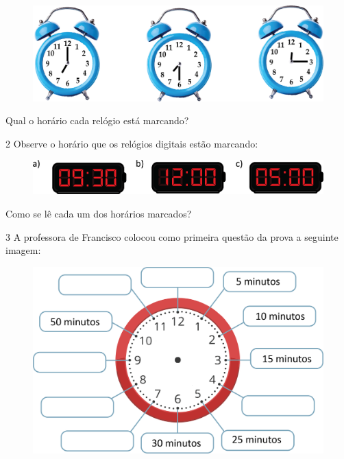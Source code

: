 \begin{figure}[htpb!]
\includegraphics[width=\textwidth]{./media/image51.png}
\end{figure}

Qual o horário cada relógio está marcando?

\pagebreak

\num{2} Observe o horário que os relógios digitais estão marcando:

\begin{figure}[htpb!]
\includegraphics[width=\textwidth]{./media/image52.png}
\end{figure}

Como se lê cada um dos horários marcados?

\num{3} A professora de Francisco colocou como primeira questão da prova a seguinte imagem:

\begin{figure}[htpb!]
\centering
\includegraphics[width=\textwidth]{./media/image53.png}
\end{figure}

